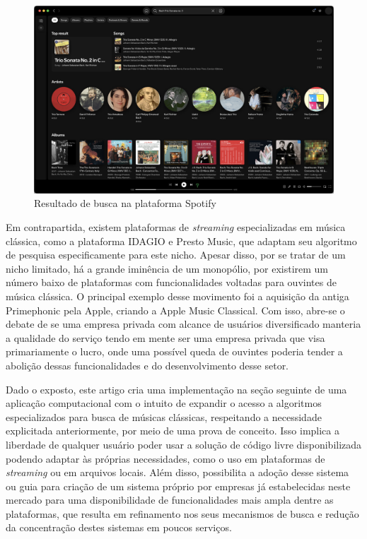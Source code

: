 \documentclass[12pt]{article}
\begin{document}
\begin{figure}[ht]
\centering
\includegraphics[width=1\textwidth]{figuras/Spotify.png}
\caption{Resultado de busca na plataforma Spotify}
\label{fig:spotify}
\end{figure}

Em contrapartida, existem plataformas de \emph{streaming} especializadas em
música clássica, como a plataforma IDAGIO e Presto Music, que adaptam seu
algoritmo de pesquisa especificamente para este nicho. Apesar disso, por se
tratar de um nicho limitado, há a grande iminência de um monopólio, por
existirem um número baixo de plataformas com funcionalidades voltadas para
ouvintes de música clássica. O principal exemplo desse movimento foi a aquisição
da antiga Primephonic pela Apple, criando a Apple Music Classical. Com isso,
abre-se o debate de se uma empresa privada com alcance de usuários diversificado
manteria a qualidade do serviço tendo em mente ser uma empresa privada que visa
primariamente o lucro, onde uma possível queda de ouvintes poderia tender a
abolição dessas funcionalidades e do desenvolvimento desse setor.

Dado o exposto, este artigo cria uma implementação na seção seguinte de uma
aplicação computacional com o intuito de expandir o acesso a algoritmos
especializados para busca de músicas clássicas, respeitando a necessidade
explicitada anteriormente, por meio de uma prova de conceito. Isso implica a
liberdade de qualquer usuário poder usar a solução de código livre
disponibilizada podendo adaptar às próprias necessidades, como o uso em
plataformas de \emph{streaming} ou em arquivos locais. Além disso, possibilita a
adoção desse sistema ou guia para criação de um sistema próprio por empresas já
estabelecidas neste mercado para uma disponibilidade de funcionalidades mais
ampla dentre as plataformas, que resulta em refinamento nos seus mecanismos de
busca e redução da concentração destes sistemas em poucos serviços.
\end{document}
